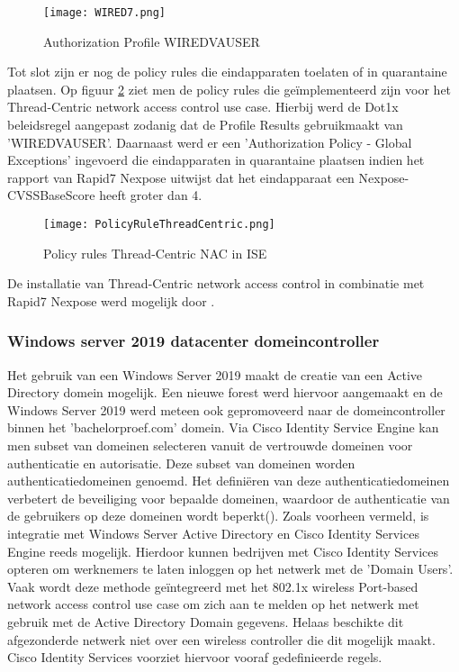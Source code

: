  \begin{figure}[H]
	 	\centering
	 	\texttt{[image: WIRED7.png]}
	 	\caption{Authorization Profile WIRED\textunderscore VA\textunderscore USER}%
	 	\label{fig:WIRED}%
 \end{figure}

Tot slot zijn er nog de policy rules die eindapparaten toelaten of in
quarantaine plaatsen. Op figuur \ref{fig:quarin} ziet men de policy rules die geïmplementeerd zijn voor het Thread-Centric network access control use case. Hierbij werd de Dot1x beleidsregel aangepast zodanig dat de Profile Results gebruikmaakt van 'WIRED\textunderscore VA\textunderscore USER'. Daarnaast werd er een 'Authorization Policy - Global Exceptions' ingevoerd die eindapparaten in quarantaine plaatsen indien het rapport van Rapid7 Nexpose uitwijst dat het eindapparaat een Nexpose-CVSS\textunderscore Base\textunderscore Score heeft groter dan 4. 

  \begin{figure}[H]
 	\centering
 	\texttt{[image: PolicyRuleThreadCentric.png]}
 	\caption{Policy rules Thread-Centric NAC in ISE}%
 	\label{fig:quarin}%
 \end{figure}
 
 De installatie van Thread-Centric network access control in combinatie met Rapid7 Nexpose werd mogelijk door \cite{thread_yt}.

 
\subsubsection{Windows server 2019 datacenter domeincontroller}
Het gebruik van een Windows Server 2019 maakt de creatie van een Active Directory domein mogelijk. Een nieuwe forest werd hiervoor aangemaakt en de Windows Server 2019 werd meteen ook gepromoveerd naar de domeincontroller binnen het 'bachelorproef.com' domein.
\newline
\newline
Via Cisco Identity Service Engine kan men subset van domeinen selecteren vanuit de vertrouwde domeinen voor authenticatie en autorisatie. Deze subset van domeinen worden authenticatiedomeinen genoemd. Het definiëren van deze authenticatiedomeinen verbetert de beveiliging voor bepaalde domeinen, waardoor de authenticatie van de gebruikers op deze domeinen wordt beperkt(\cite{winISE}).
\newline
\newline
Zoals voorheen vermeld, is integratie met Windows Server Active Directory en Cisco Identity Services Engine reeds mogelijk. Hierdoor kunnen bedrijven met Cisco Identity Services opteren om werknemers te laten inloggen op het netwerk met de 'Domain Users’. Vaak wordt deze methode geïntegreerd met het 802.1x wireless Port-based network access control use case om zich aan te melden op het netwerk met gebruik met de Active Directory Domain gegevens. Helaas beschikte dit afgezonderde netwerk niet over een wireless controller die dit mogelijk maakt. Cisco Identity Services voorziet hiervoor vooraf gedefinieerde regels.

